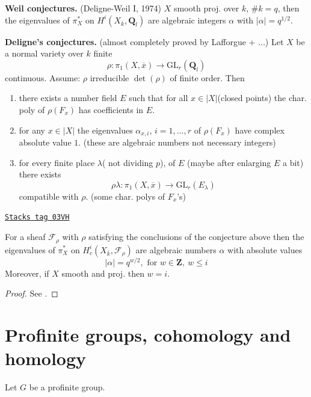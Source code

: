 {\bf Weil conjectures.} (Deligne-Weil I, 1974) $X$ smooth proj. over $k$,
$\# k = q$, then the eigenvalues of $\pi_X^*$ on $H^i(X_{\overline{k}},
\mathbf{Q}_l)$ are algebraic integers $\alpha$ with $|\alpha|=q^{1/2}$.

\medskip\noindent
{\bf Deligne's conjectures.} (almost completely proved by
Lafforgue + $\ldots$) Let $X$ be a normal variety over $k$ finite
$$
\rho : \pi_1(X, \overline{x}) \longrightarrow \text{GL}_r(\mathbf{Q}_l)
$$
continuous. Assume: $\rho$ irreducible $\det(\rho)$ of finite order. Then
\begin{enumerate}
\item there exists a number field $E$ such that for all $x\in
|X|$(closed points) the char. poly of $\rho(F_x)$ has coefficients in $E$.
\item for any $x\in |X|$ the eigenvalues $\alpha_{x, i}$, $i = 1, \ldots,
r$ of $\rho(F_x)$ have complex absolute value $1$.
(these are algebraic numbers not necessary integers)
\item for every finite place $\lambda$( not dividing $p$), of $E$
(maybe after enlarging $E$ a bit) there exists
$$
\rho\lambda : \pi_1(X, \overline{x}) \to \text{GL}_r(E_\lambda)
$$
compatible with $\rho$. (some char. polys of $F_x$'s)
\end{enumerate}

\begin{theorem}

\label{trace-theorem-weil-II}
\href{https://stacks.math.columbia.edu/tag/03VH}{\texttt{Stacks tag 03VH}}

For a sheaf
$\mathcal{F}_\rho$ with $\rho$ satisfying the conclusions of the conjecture
above then the eigenvalues of $\pi_X^*$ on $H_c^i(X_{\overline{k}},
\mathcal{F}_{\rho})$ are algebraic numbers $\alpha$ with absolute values
$$
|\alpha|=q^{w/2}, \text{ for }w\in \mathbf{Z},\ w\leq i
$$
Moreover, if $X$ smooth and proj. then $w = i$.
\end{theorem}

\begin{proof}
See \cite{WeilII}.
\end{proof}



\section{Profinite groups, cohomology and homology}
\label{trace-section-profinite-cohomology}
Let $G$ be a profinite group.


